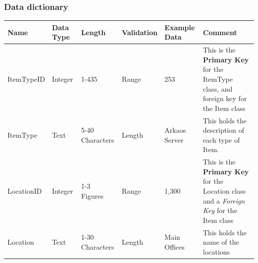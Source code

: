 \begin{landscape}

    \begin{center}
    \subsubsection{Data dictionary}
    \end{center}
    
    \begin{center}
        \begin{tabular}{|p{3cm}|p{2cm}|p{3cm}|p{2cm}|p{2cm}|p{5cm}|}
            \hline
            \textbf{Name} & \textbf{Data Type} & \textbf{Length} & \textbf{Validation} & \textbf{Example Data} & \textbf{Comment} \\ \hline
            ItemTypeID & Integer & 1-435 & Range & 253 & This is the \textbf{Primary Key} for the ItemType class, and foreign key for the Item class \\ \hline
            ItemType & Text & 5-40 Characters & Length & Arkaos Server & This holds the description of each type of Item. \\ \hline
            LocationID & Integer & 1-3 Figures & Range & 1,300 & This is the \textbf{Primary Key} for the Location class and a \emph{Foreign Key} for the Item class \\ \hline
            Location & Text & 1-30 Characters & Length & Main Offices  & This holds the name of the locations \\ \hline
            \end{tabular}
    \end{center}
\end{landscape}


